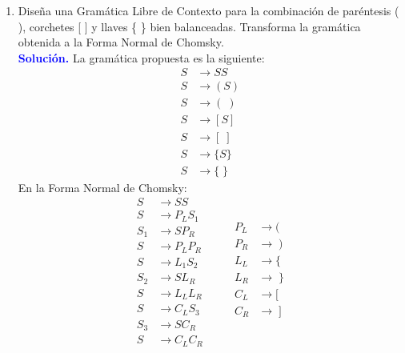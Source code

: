 \documentclass[11pt,fleqn]{article}
\newcommand{\solution}{\textcolor{blue}{\textbf{Solución. }}}
\begin{document}
\begin{enumerate}
    \item Diseña una Gramática Libre de Contexto para la combinación de paréntesis ( ), corchetes [ ] y llaves \{ \} bien balanceadas. Transforma la gramática obtenida a la Forma Normal de Chomsky. \\
    \solution La gramática propuesta es la siguiente:
    \begin{align*}
        S &\rightarrow SS \\
        S &\rightarrow (S) \\
        S &\rightarrow (\phantom{.}) \\
        S &\rightarrow [S] \\
        S &\rightarrow [\phantom{.}] \\
        S &\rightarrow \{S\} \\
        S &\rightarrow \{\phantom{.}\}
    \end{align*}
    En la Forma Normal de Chomsky:
    \begin{equation*}
        \begin{split}
            S &\rightarrow SS \\
            S &\rightarrow P_LS_1 \\
            S_1 &\rightarrow SP_R \\
            S &\rightarrow P_LP_R \\
            S &\rightarrow L_1S_2 \\
            S_2 &\rightarrow SL_R \\
            S &\rightarrow L_LL_R \\
            S &\rightarrow C_LS_3 \\
            S_3 &\rightarrow SC_R \\
            S &\rightarrow C_LC_R
        \end{split} \qquad
        \begin{split}
            P_L &\rightarrow ( \\
            P_R &\rightarrow \phantom{.} ) \\
            L_L &\rightarrow \{ \\
            L_R &\rightarrow \phantom{.}\} \\
            C_L &\rightarrow [ \\
            C_R &\rightarrow \phantom{.}] \\
        \end{split}     
    \end{equation*}
    

\end{enumerate}
\end{document}
